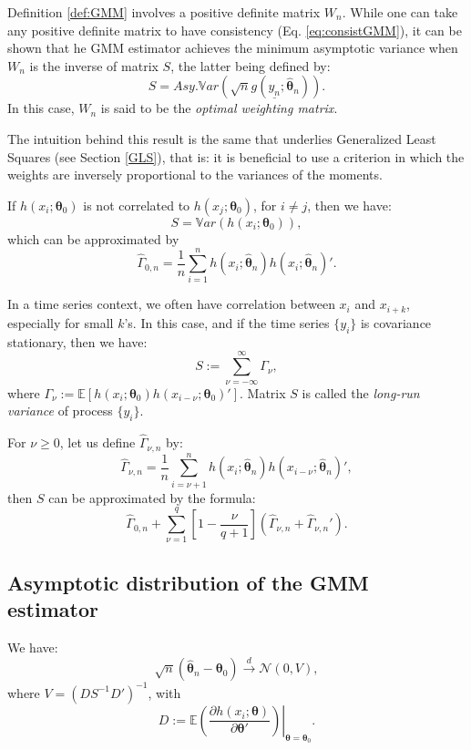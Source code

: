 \documentclass[
  12pt,
]{book}
\theoremstyle{definition}
\theoremstyle{definition}
\theoremstyle{definition}
\theoremstyle{definition}
\theoremstyle{remark}
\begin{document}
Definition \ref{def:GMM} involves a positive definite matrix \(W_n\). While one can take any positive definite matrix to have consistency (Eq. \eqref{eq:consistGMM}), it can be shown that he GMM estimator achieves the minimum asymptotic variance when \(W_n\) is the inverse of matrix \(S\), the latter being defined by:
\[
S = Asy.\mathbb{V}ar\left(\sqrt{n}g(\underline{y_n};\hat{\boldsymbol\theta}_n)\right).
\]
In this case, \(W_n\) is said to be the \emph{optimal weighting matrix}.

The intuition behind this result is the same that underlies Generalized Least Squares (see Section \ref{GLS}), that is: it is beneficial to use a criterion in which the weights are inversely proportional to the variances of the moments.

If \(h(x_i;\boldsymbol\theta_0)\) is not correlated to \(h(x_j;\boldsymbol\theta_0)\), for \(i \ne j\), then we have:
\[
S = \mathbb{V}ar(h(x_i;\boldsymbol\theta_0)),
\]
which can be approximated by
\[
\hat{\Gamma}_{0,n}=\frac{1}{n}\sum_{i=1}^{n} h(x_i;\hat{\boldsymbol\theta}_n)h(x_{i};\hat{\boldsymbol\theta}_n)'.
\]

In a time series context, we often have correlation between \(x_i\) and \(x_{i+k}\), especially for small \(k\)'s. In this case, and if the time series \(\{y_i\}\) is covariance stationary, then we have:
\[
S := \sum_{\nu = -\infty}^{\infty} \Gamma_\nu,
\]
where \(\Gamma_\nu := \mathbb{E}[h(x_i;\boldsymbol\theta_0) h(x_{i-\nu};\boldsymbol\theta_0)']\). Matrix \(S\) is called the \emph{long-run variance} of process \(\{y_i\}\).

For \(\nu \ge 0\), let us define \(\hat{\Gamma}_{\nu,n}\) by:
\[
\hat{\Gamma}_{\nu,n} = \frac{1}{n} \sum_{i=\nu + 1}^{n} h(x_i;\hat{\boldsymbol\theta}_n)h(x_{i-\nu};\hat{\boldsymbol\theta}_n)',
\]
then \(S\) can be approximated by the \citet{Newey_West_1987} formula:
\begin{equation}
\hat{\Gamma}_{0,n} + \sum_{\nu=1}^{q}\left[1-\frac{\nu}{q+1}\right](\hat{\Gamma}_{\nu,n}+\hat{\Gamma}_{\nu,n}').    \label{eq:Shat}
\end{equation}

\hypertarget{asymptotic-distribution-of-the-gmm-estimator}{%
\subsection{Asymptotic distribution of the GMM estimator}\label{asymptotic-distribution-of-the-gmm-estimator}}

We have:
\begin{equation}
\boxed{\sqrt{n}(\hat{\boldsymbol\theta}_n - \boldsymbol\theta_0) \overset{d}{\rightarrow} \mathcal{N}(0,V),}\label{eq:asymptGMM}
\end{equation}
where \(V = (DS^{-1}D')^{-1}\), with
\[
D := \left.\mathbb{E}\left(\frac{\partial h(x_i;\boldsymbol\theta)}{\partial \boldsymbol\theta'}\right)\right|_{\boldsymbol\theta = \boldsymbol\theta_0}.
\]
\end{document}
